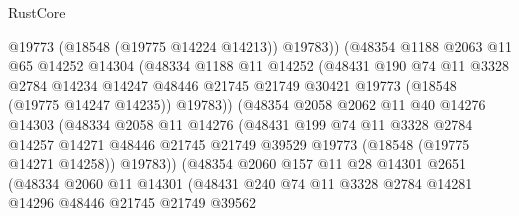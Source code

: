 \begin{lexlean}{RustCore}
\begin{coremodule}
                        @19773
                        (@18548 (@19775 @14224 @14213))
                        @19783))
                    (@48354
                      @1188
                      @2063
                      @11
                      @65
                      @14252
                      @14304
                      (@48334
                        @1188
                        @11
                        @14252
                        (@48431
                          @190
                          @74
                          @11
                          @3328
                          @2784
                          @14234
                          @14247
                          @48446
                          @21745
                          @21749
                          @30421
                          @19773
                          (@18548 (@19775 @14247 @14235))
                          @19783))
                      (@48354
                        @2058
                        @2062
                        @11
                        @40
                        @14276
                        @14303
                        (@48334
                          @2058
                          @11
                          @14276
                          (@48431
                            @199
                            @74
                            @11
                            @3328
                            @2784
                            @14257
                            @14271
                            @48446
                            @21745
                            @21749
                            @39529
                            @19773
                            (@18548 (@19775 @14271 @14258))
                            @19783))
                        (@48354
                          @2060
                          @157
                          @11
                          @28
                          @14301
                          @2651
                          (@48334
                            @2060
                            @11
                            @14301
                            (@48431
                              @240
                              @74
                              @11
                              @3328
                              @2784
                              @14281
                              @14296
                              @48446
                              @21745
                              @21749
                              @39562

\end{coremodule}
\end{lexlean}
